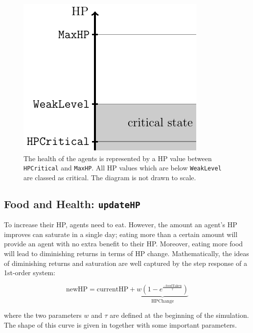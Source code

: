 \begin{figure}[htb]
    \centering
    \includegraphics[width=0.3\linewidth]{002_simulation_structure/images/health_global.pdf}
    \caption{The health of the agents is represented by a HP value between \lstinline$HPCritical$ and \lstinline$MaxHP$. All HP values which are below \lstinline$WeakLevel$ are classed as critical. The diagram is not drawn to scale.}
    \label{fig:health_system}
\end{figure}

\subsection{Food and Health: \lstinline$updateHP$}\label{updateHP}
To increase their HP, agents need to eat. However, the amount an agent's HP improves can saturate in a single day; eating more than a certain amount will provide an agent with no extra benefit to their HP. Moreover, eating more food will lead to diminishing returns in terms of HP change. Mathematically, the ideas of diminishing returns and saturation are well captured by the step response of a 1st-order system:

\begin{equation}\label{updateHP_general}
   \text{newHP}= \text{currentHP} +\underbrace{w(1-e^{\frac{-\text{foodTaken}}{\tau}})}_{\text{HPChange}}
\end{equation}

where the two parameters $w$ and $\tau$ are defined at the beginning of the simulation. The shape of this curve is given in  together with some important parameters.

